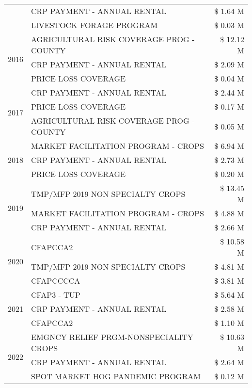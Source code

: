\begin{tabular}{llr}
 & CRP PAYMENT - ANNUAL RENTAL & \$ 1.64 M \\
 & LIVESTOCK FORAGE PROGRAM & \$ 0.03 M \\
\cline{1-3}
\multirow[t]{3}{*}{2016} & AGRICULTURAL RISK COVERAGE PROG - COUNTY & \$ 12.12 M \\
 & CRP PAYMENT - ANNUAL RENTAL & \$ 2.09 M \\
 & PRICE LOSS COVERAGE & \$ 0.04 M \\
\cline{1-3}
\multirow[t]{3}{*}{2017} & CRP PAYMENT - ANNUAL RENTAL & \$ 2.44 M \\
 & PRICE LOSS COVERAGE & \$ 0.17 M \\
 & AGRICULTURAL RISK COVERAGE PROG - COUNTY & \$ 0.05 M \\
\cline{1-3}
\multirow[t]{3}{*}{2018} & MARKET FACILITATION PROGRAM - CROPS & \$ 6.94 M \\
 & CRP PAYMENT - ANNUAL RENTAL & \$ 2.73 M \\
 & PRICE LOSS COVERAGE & \$ 0.20 M \\
\cline{1-3}
\multirow[t]{3}{*}{2019} & TMP/MFP 2019 NON SPECIALTY CROPS & \$ 13.45 M \\
 & MARKET FACILITATION PROGRAM - CROPS & \$ 4.88 M \\
 & CRP PAYMENT - ANNUAL RENTAL & \$ 2.66 M \\
\cline{1-3}
\multirow[t]{3}{*}{2020} & CFAPCCA2 & \$ 10.58 M \\
 & TMP/MFP 2019 NON SPECIALTY CROPS & \$ 4.81 M \\
 & CFAPCCCCA & \$ 3.81 M \\
\cline{1-3}
\multirow[t]{3}{*}{2021} & CFAP3 - TUP & \$ 5.64 M \\
 & CRP PAYMENT - ANNUAL RENTAL & \$ 2.58 M \\
 & CFAPCCA2 & \$ 1.10 M \\
\cline{1-3}
\multirow[t]{3}{*}{2022} & EMGNCY RELIEF PRGM-NONSPECIALITY CROPS & \$ 10.63 M \\
 & CRP PAYMENT - ANNUAL RENTAL & \$ 2.64 M \\
 & SPOT MARKET HOG PANDEMIC PROGRAM & \$ 0.12 M \\
\cline{1-3}
\bottomrule
\end{tabular}
